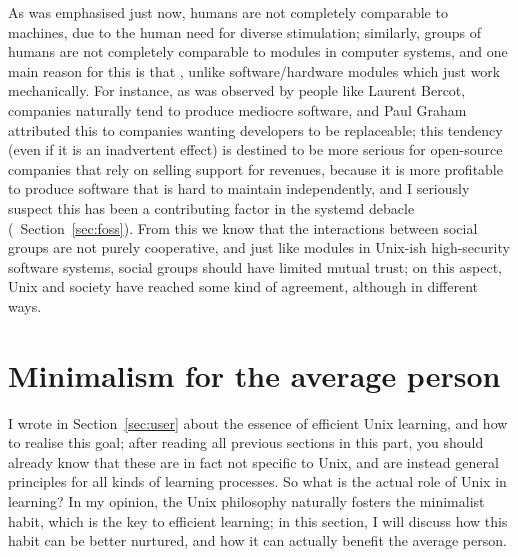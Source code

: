 As was emphasised just now, humans are not completely comparable to machines,
due to the human need for diverse stimulation; similarly, groups of humans
are not completely comparable to modules in computer systems, and one main
reason for this is that , unlike software/hardware modules which just work mechanically.  For
instance, as was observed by people like Laurent Bercot,
companies naturally tend to produce mediocre software, and Paul Graham
attributed this to companies wanting developers to be
replaceable; this tendency (even if it is an inadvertent effect) is destined
to be more serious for open-source companies that rely on selling support for
revenues, because it is more profitable to produce software that is hard to
maintain independently, and I seriously suspect this has been a contributing
factor in the systemd debacle (\cf~Section~\ref{sec:foss}).  From this we know
that the interactions between social groups are not purely cooperative, and just
like modules in Unix-ish high-security software systems,
social groups should have limited mutual trust; on this aspect, Unix and
society have reached some kind of agreement, although in different ways.

\section{Minimalism for the average person}\label{sec:worklife}

I wrote in Section~\ref{sec:user} about the essence of efficient Unix learning,
and how to realise this goal; after reading all previous sections in this part,
you should already know that these are in fact not specific to Unix, and are
instead general principles for all kinds of learning processes.  So what is
the actual role of Unix in learning?  In my opinion, the Unix philosophy
naturally fosters the minimalist habit, which is the key to efficient
learning; in this section, I will discuss how this habit can be better
nurtured, and how it can actually benefit the average person.

